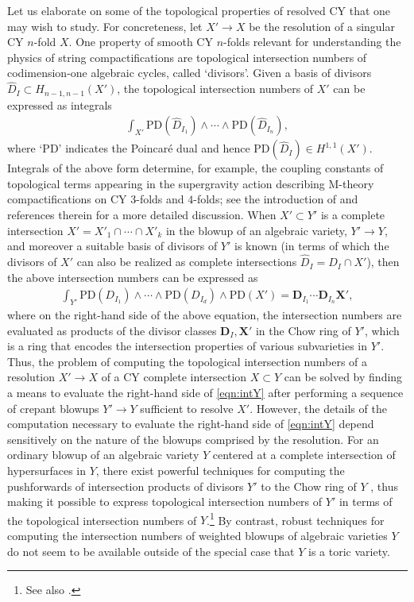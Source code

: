 \documentclass[11pt,oneside,english]{article}
\numberwithin{equation}{section}
\theoremstyle{definition}
\begin{document}
Let us elaborate on some of the topological properties of resolved CY that one may wish to study. For concreteness, let $X' \rightarrow X$ be the resolution of a singular CY $n$-fold $X$. One property of smooth CY $n$-folds relevant for understanding the physics of string compactifications are topological intersection numbers of codimension-one algebraic cycles, called `divisors'. Given a basis of divisors $\hat D_I \subset H_{n-1,n-1}(X')$, the topological intersection numbers of $X'$ can be expressed as integrals
	\begin{align}
		\int_{X'} \text{PD}(\hat D_{I_1}) \wedge \cdots \wedge \text{PD}( \hat D_{I_n}),
	\end{align}
where `PD' indicates the Poincar\'e dual and hence $\text{PD}(\hat D_I) \in H^{1,1}(X')$. Integrals of the above form determine, for example, the coupling constants of topological terms appearing in the supergravity action describing M-theory compactifications on CY $3$-folds and $4$-folds; see the introduction of \cite{Jefferson:2022xft} and references therein for a more detailed discussion. When $X' \subset Y'$ is a complete intersection $X' = X'_1 \cap \cdots \cap X'_k$ in the blowup of an algebraic variety, $Y' \rightarrow Y$, and moreover a suitable basis of divisors of $Y'$ is known (in terms of which the divisors of $X'$ can also be realized as complete intersections $\hat D_I =  D_I \cap  X'$), then the above intersection numbers can be expressed as 
	\begin{align}
	\label{eqn:intY}
			\int_{Y'} \text{PD}( D_{I_1}) \wedge \cdots \wedge \text{PD}( D_{I_d}) \wedge \text{PD}( X') = \boldsymbol D_{I_1} \cdots \boldsymbol D_{I_n}  \boldsymbol X',
	\end{align}
where on the right-hand side of the above equation, the intersection numbers are evaluated as products of the divisor classes $\boldsymbol D_I, \boldsymbol X'$ in the Chow ring of $Y'$, which is a ring that encodes the intersection properties of various subvarieties in $Y'$. Thus, the problem of computing the topological intersection numbers of a resolution $X' \rightarrow X$ of a CY complete intersection $X \subset Y$ can be solved by finding a means to evaluate the right-hand side of \cref{eqn:intY} after performing a sequence of crepant blowups $Y' \rightarrow Y$ sufficient to resolve $X'$. However, the details of the computation necessary to evaluate the right-hand side of \cref{eqn:intY} depend sensitively on the nature of the blowups comprised by the resolution. For an ordinary blowup of an algebraic variety $Y$ centered at a complete intersection of hypersurfaces in $Y$, there exist powerful techniques for computing the pushforwards of intersection products of divisors $Y'$ to the Chow ring of $Y$ \cite{fulton,Fullwood:2011zb,Fullwood:2012kj,Esole:2017kyr}, thus making it possible to express topological intersection numbers of $Y'$ in terms of the topological intersection numbers of $Y$.\footnote{See also \cite{Esole:2018tuz,Esole:2018bmf}.} By contrast, robust techniques for computing the intersection numbers of weighted blowups of algebraic varieties $Y$ do not seem to be available outside of the special case that $Y$ is a toric variety.
\end{document}
